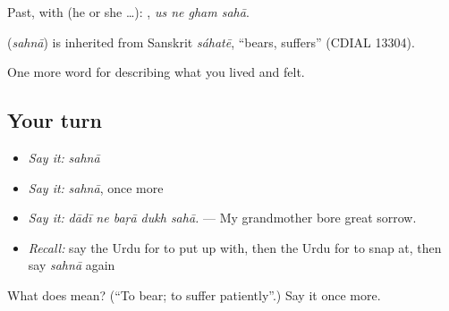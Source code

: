 Past, with  (he or she …):    , \emph{us ne gham sahā}.

\begin{cousinweb}
\textbf{} (\emph{sahnā}) is inherited from Sanskrit \emph{sáhatē}, \textquotedblleft{}bears, suffers\textquotedblright{} (CDIAL 13304).
\end{cousinweb}

\begin{grammarlens}[title={What you've built}]
One more word for describing what you lived and felt.
\end{grammarlens}

\subsection*{Your turn}
\begin{itemize}
\raggedright
  \item \emph{Say it:} \emph{sahnā}
  \item \emph{Say it:} \emph{sahnā}, once more
  \item \emph{Say it:} \emph{dādī ne baṛā dukh sahā.} — My grandmother bore great sorrow.
  \item \emph{Recall:} say the Urdu for to put up with, then the Urdu for to snap at, then say \emph{sahnā} again
\end{itemize}

\begin{tcolorbox}[breakable,colback=teal!4,colframe=teal!35!black,title={Before you move on}]
What does  mean? (\textquotedblleft{}To bear; to suffer patiently\textquotedblright{}.) Say it once more.
\end{tcolorbox}
